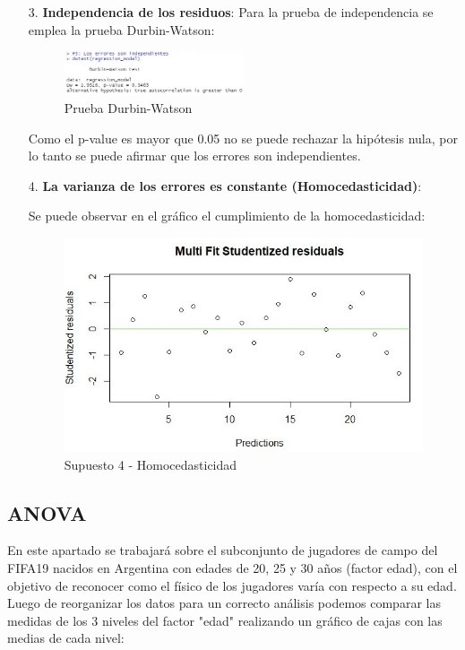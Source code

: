\documentclass[a4paper,10pt,twocolumn]{article}
\begin{document}
\begin{enumerate}
	\item [3.] \textbf{Independencia de los residuos}:
	Para la prueba de independencia se emplea la prueba Durbin-Watson:
	
	\begin{figure}[h]
		\includegraphics[width=0.5\textwidth]{./imgs/reg_3.jpg}
		\caption{Prueba Durbin-Watson}
	\end{figure}
	
	Como el p-value es mayor que 0.05 no se puede rechazar la hipótesis nula, por lo tanto se puede afirmar que los errores son independientes. 
	
	\item[4.] \textbf{La varianza de los errores es constante (Homocedasticidad)}:
	
	Se puede observar en el gráfico el cumplimiento de la homocedasticidad:
	
	\begin{figure}[h]
		\includegraphics[scale=0.5]{./imgs/reg_4.jpg}
		\caption{Supuesto 4 - Homocedasticidad}
	\end{figure}
	
\end{enumerate}

\subsection*{ANOVA}

En este apartado se trabajará sobre el subconjunto de jugadores de campo del FIFA19 nacidos en Argentina con edades de 20, 25 y 30 años (factor edad), con el objetivo de reconocer como el físico de los jugadores varía con respecto a su edad.\\
Luego de reorganizar los datos para un correcto análisis podemos comparar las medidas de los 3 niveles del factor "edad" realizando un gráfico de cajas con las medias de cada nivel:
\end{document}
